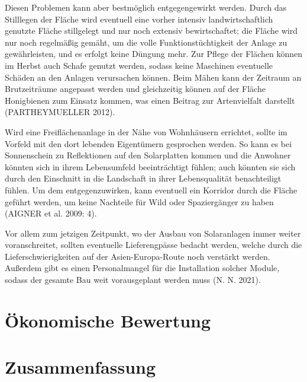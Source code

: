 \documentclass[11pt]{scrartcl}
\begin{document}
Diesen Problemen kann aber bestmöglich entgegengewirkt werden.
Durch das Stilllegen der Fläche wird eventuell eine vorher intensiv landwirtschaftlich genutzte Fläche stillgelegt und nur noch extensiv bewirtschaftet; die Fläche wird nur noch regelmäßig gemäht, um die volle Funktionstüchtigkeit der Anlage zu gewährleisten, und es erfolgt keine Düngung mehr.
Zur Pflege der Flächen können im Herbst auch Schafe genutzt werden, sodass keine Maschinen eventuelle Schäden an den Anlagen verursachen können.
Beim Mähen kann der Zeitraum an Brutzeiträume angepasst werden und gleichzeitig können auf der Fläche Honigbienen zum Einsatz kommen, was einen Beitrag zur Artenvielfalt darstellt (PARTHEYMUELLER 2012).
 
Wird eine Freiflächenanlage in der Nähe von Wohnhäusern errichtet, sollte im Vorfeld mit den dort lebenden Eigentümern gesprochen werden.
So kann es bei Sonnenschein zu Reflektionen auf den Solarplatten kommen und die Anwohner könnten sich in ihrem Lebensumfeld beeinträchtigt fühlen; auch könnten sie sich durch den Einschnitt in die Landschaft in ihrer Lebensqualität benachteiligt fühlen.
Um dem entgegenzuwirken, kann eventuell ein Korridor durch die Fläche geführt werden, um keine Nachteile für Wild oder Spaziergänger zu haben (AIGNER et al. 2009: 4).
 
Vor allem zum jetzigen Zeitpunkt, wo der Ausbau von Solaranlagen immer weiter voranschreitet, sollten eventuelle Lieferengpässe bedacht werden, welche durch die Lieferschwierigkeiten auf der Asien-Europa-Route noch verstärkt werden.
Außerdem gibt es einen Personalmangel für die Installation solcher Module, sodass der gesamte Bau weit vorausgeplant werden muss (N. N. 2021).


\section{Ökonomische Bewertung}

\section{Zusammenfassung}
\end{document}
